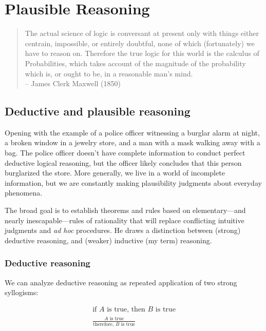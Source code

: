 \chapter{Plausible Reasoning}

\begin{quotation}
    The actual science of logic is conversant at present only with things either centrain,
    impossible, or entirely doubtful, none of which (fortunately) we have to reason on.
    Therefore the true logic for this world is the calculus of Probabilities, which takes
    account of the magnitude of the probability which is, or ought to be, in a reasonable
    man's mind.\\
    \hfill -- James Clerk Maxwell (1850)
\end{quotation}

\section{Deductive and plausible reasoning}

Opening with the example of a police officer witnessing a burglar alarm at night, a broken
window in a jewelry store, and a man with a mask walking away with a bag. The police
officer doesn't have complete information to conduct perfect deductive logical reasoning,
but the officer likely concludes that this person burglarized the store. More generally,
we live in a world of incomplete information, but we are constantly making plausibility
judgments about everyday phenomena.

The broad goal is to establish theorems and rules based on elementary---and nearly
inescapable---rules of rationality that will replace conflicting intuitive judgments and
\emph{ad hoc} procedures. He draws a distinction between (strong) deductive reasoning, and
(weaker) inductive (my term) reasoning.

\subsection{Deductive reasoning}

We can analyze deductive reasoning as repeated application of two strong syllogisms:

\begin{gather*}
    \text{if } A \text{ is true, then } B \text{ is true}\\
    \frac{A \text{ is true}}{\text{therefore, } B \text{ is true}}
\end{gather*}

